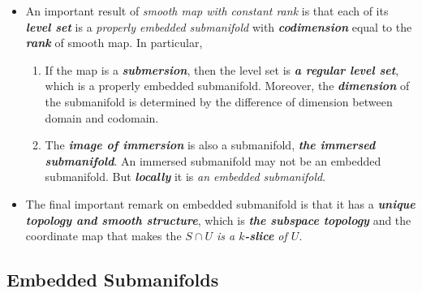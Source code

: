 \documentclass[11pt]{article}
\begin{document}
\begin{itemize}
\item \begin{remark}
An important result of \emph{smooth map with constant rank} is that each of its \emph{\textbf{level set}} is a \emph{properly embedded submanifold} with \emph{\textbf{codimension}} equal to the \emph{\textbf{rank}} of smooth map.  In particular,
\begin{enumerate}
\item If the map is a \emph{\textbf{submersion}}, then the level set is \emph{\textbf{a regular level set}}, which is a properly embedded submanifold. Moreover, the \emph{\textbf{dimension}} of the submanifold is determined by the difference of dimension between domain and codomain.
\item The \emph{\textbf{image of immersion}} is also a submanifold, \emph{\textbf{the immersed submanifold}}. An immersed submanifold may not be an embedded submanifold. But \emph{\textbf{locally}} it is \emph{an embedded submanifold}.
\end{enumerate}
\end{remark}

\item \begin{remark} The final important remark on embedded submanifold is that it has a \emph{\textbf{unique}} \emph{\textbf{topology and smooth structure}}, which is \emph{\textbf{the subspace topology}} and the coordinate map that makes the \emph{$S\cap U$ is a \textbf{$k$-slice} of $U$}. 
\end{remark}
\end{itemize}
\subsection{Embedded Submanifolds}
\end{document}
